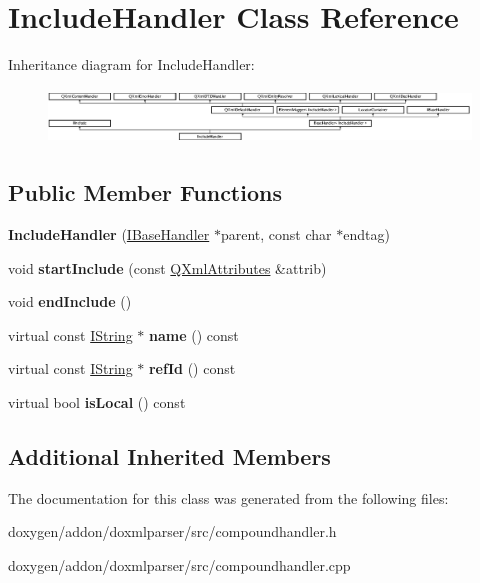 \hypertarget{class_include_handler}{}\section{Include\+Handler Class Reference}
\label{class_include_handler}
Inheritance diagram for Include\+Handler\+:\begin{figure}[H]
\begin{center}
\leavevmode
\includegraphics[height=1.467890cm]{class_include_handler}
\end{center}
\end{figure}
\subsection*{Public Member Functions}
\begin{DoxyCompactItemize}
\item 
\mbox{\label{class_include_handler_af6007f1851b6179181f54adab957dc6b}} 
{\bfseries Include\+Handler} (\mbox{\hyperlink{class_i_base_handler}{I\+Base\+Handler}} $\ast$parent, const char $\ast$endtag)
\item 
\mbox{\label{class_include_handler_a9f302d0dc58cf30352e206c5a799fa5e}} 
void {\bfseries start\+Include} (const \mbox{\hyperlink{class_q_xml_attributes}{Q\+Xml\+Attributes}} \&attrib)
\item 
\mbox{\label{class_include_handler_aba7e0fa869808eb5b7a418235c1be335}} 
void {\bfseries end\+Include} ()
\item 
\mbox{\label{class_include_handler_a5764d7b28cf6eff7cf86784efda786d8}} 
virtual const \mbox{\hyperlink{class_i_string}{I\+String}} $\ast$ {\bfseries name} () const
\item 
\mbox{\label{class_include_handler_aea1251681aeec9008ca950b6c13b735d}} 
virtual const \mbox{\hyperlink{class_i_string}{I\+String}} $\ast$ {\bfseries ref\+Id} () const
\item 
\mbox{\label{class_include_handler_a4cee46fdf8931756186e5038203aaffb}} 
virtual bool {\bfseries is\+Local} () const
\end{DoxyCompactItemize}
\subsection*{Additional Inherited Members}


The documentation for this class was generated from the following files\+:\begin{DoxyCompactItemize}
\item 
doxygen/addon/doxmlparser/src/compoundhandler.\+h\item 
doxygen/addon/doxmlparser/src/compoundhandler.\+cpp\end{DoxyCompactItemize}
